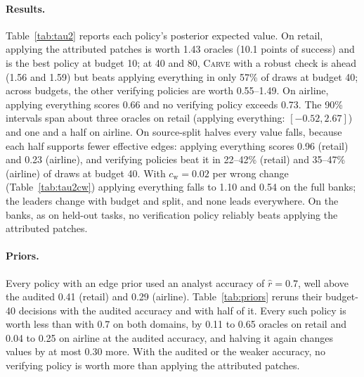 \documentclass[11pt]{article}
\newcommand{\carve}{\textsc{Carve}}
\begin{document}
\paragraph{Results.} Table~\ref{tab:tau2} reports each policy's posterior expected value. On retail, applying the attributed patches is worth 1.43 oracles (10.1 points of success) and is the best policy at budget 10; at 40 and 80, \carve{} with a robust check is ahead (1.56 and 1.59) but beats applying everything in only 57\% of draws at budget 40; across budgets, the other verifying policies are worth 0.55--1.49. On airline, applying everything scores 0.66 and no verifying policy exceeds 0.73. The 90\% intervals span about three oracles on retail (applying everything: $[-0.52,2.67]$) and one and a half on airline. On source-split halves every value falls, because each half supports fewer effective edges: applying everything scores 0.96 (retail) and 0.23 (airline), and verifying policies beat it in 22--42\% (retail) and 35--47\% (airline) of draws at budget 40. With $c_{\mathrm w}=0.02$ per wrong change (Table~\ref{tab:tau2cw}) applying everything falls to 1.10 and 0.54 on the full banks; the leaders change with budget and split, and none leads everywhere. On the banks, as on held-out tasks, no verification policy reliably beats applying the attributed patches.

\begin{table}[t]
\centering
\small
\setlength{\tabcolsep}{3pt}
\caption{Policies that use the edge prior of Eq.~\ref{eq:prior}, with the analyst accuracy used in the main analysis (0.7), the audited accuracy and half of it; posterior value of deployable sets at budget 40 and $c=0$ on the full bank (binomial harm model). Apply attributed uses no prior.}
\label{tab:priors}
\end{table}

\paragraph{Priors.} Every policy with an edge prior used an analyst accuracy of $\hat r=0.7$, well above the audited 0.41 (retail) and 0.29 (airline). Table~\ref{tab:priors} reruns their budget-40 decisions with the audited accuracy and with half of it. Every such policy is worth less than with 0.7 on both domains, by 0.11 to 0.65 oracles on retail and 0.04 to 0.25 on airline at the audited accuracy, and halving it again changes values by at most 0.30 more. With the audited or the weaker accuracy, no verifying policy is worth more than applying the attributed patches.
\end{document}
